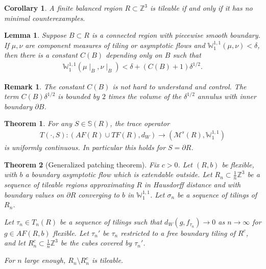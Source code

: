 \documentclass[10pt,a4paper]{amsart}
\newtheorem{thm}{Theorem}
\newtheorem{cor}{Corollary}
\newtheorem{lemma}{Lemma}
\newtheorem{rem}{Remark}
\newcommand{\m}[1]{\mathbb{#1}}
\newcommand{\mc}[1]{\mathcal{#1}}
\begin{document}
\begin{cor}\label{cor:minimal_tileable}
    A finite balanced region $R\subset \m Z^3$ is tileable if and only if it has no minimal counterexamples. 
\end{cor}

\begin{lemma}\label{lem:constant_order_box_Wass_bound}
Suppose $B\subset R$ is a connected region with piecewise smooth boundary. If $\mu, \nu$ are component measures of tiling or asymptotic flows and $\m W_1^{1,1}(\mu,\nu)<\delta$, then there is a constant $C(B)$ depending only on $B$ such that
\begin{align*}
    \m W_1^{1,1}(\mu\mid_B, \nu\mid_B) < \delta + (C(B)+1) \delta^{1/2}.
\end{align*}
\end{lemma}

\begin{rem}\label{rem:constant_explained}
    The constant $C(B)$ is not hard to understand and control. The term $C(B)\delta^{1/2}$ is bounded by $2$ times the volume of the $\delta^{1/2}$ annulus with inner boundary $\partial B$. 
\end{rem}

\begin{thm}\label{thm: boundary_value_uniformly_continuous}
For any $S\in \m S(R)$, the trace operator 
\begin{align*}
    T(\cdot,S): (AF(R)\cup TF(R),d_W) \to (\mc M^s(R), \m W_{1}^{1,1})
\end{align*}
is uniformly continuous. In particular this holds for $S = \partial R$.
\end{thm}

\begin{thm}[Generalized patching theorem]\label{thm:generalized_patching}
    Fix $c>0$. Let $(R,b)$ be flexible, with $b$ a boundary asymptotic flow which is extendable outside. Let $R_n\subset \frac{1}{n} \m Z^3$ be a sequence of tileable regions approximating $R$ in Hausdorff distance and with boundary values on $\partial R$ converging to $b$ in $\m W_1^{1,1}$. Let $\sigma_n$ be a sequence of tilings of $R_n$. 

    Let $\tau_n\in T_n(R)$ be a sequence of tilings such that $d_W(g,f_{\tau_n}) \to 0$ as $n\to \infty$ for $g\in AF(R,b)$ flexible. Let $\tau_n'$ be $\tau_n$ restricted to a free boundary tiling of $R^c$, and let $R_n^c\subset \frac{1}{n} \m Z^3$ be the cubes covered by $\tau_n'$. 
    
    For $n$ large enough, $R_n\setminus R_n^c$ is tileable. 
\end{thm}
\end{document}
